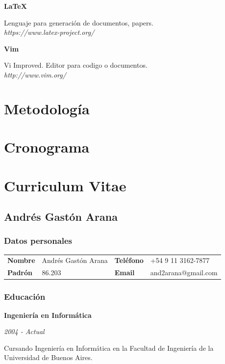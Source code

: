 \documentclass[a4paper,11pt]{article}
\begin{document}
\noindent \textbf{LaTeX}

\noindent Lenguaje para generación de documentos, papers.\\

\noindent \emph{https://www.latex-project.org/}

\noindent \textbf{Vim}

\noindent Vi Improved. Editor para codigo o documentos.\\

\noindent \emph{http://www.vim.org/}

\section{Metodología}

\section{Cronograma}

\section{Curriculum Vitae}

\subsection{Andrés Gastón Arana}

\subsubsection{Datos personales}

\noindent \begin{tabular}{l l l l}
  \textbf{Nombre} & Andrés Gastón Arana & \textbf{Teléfono} & +54 9 11 3162-7877\\
  \textbf{Padrón} & 86.203              & \textbf{Email}    & and2arana@gmail.com \\
\end{tabular}

\subsubsection{Educación}

\noindent \textbf{Ingeniería en Informática}

\noindent\emph{2004 - Actual}

\noindent Cursando Ingeniería en Informática en la Facultad de Ingeniería de la
Universidad de Buenos Aires. \\
\end{document}
